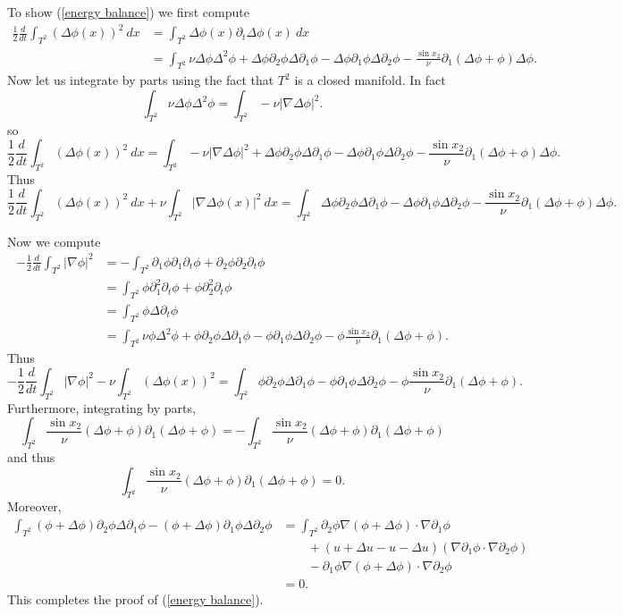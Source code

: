 \documentclass[10pt]{article}
\theoremstyle{definition}
\begin{document}
To show (\ref{energy balance}) we first compute
\begin{align*}
\frac{1}{2} \frac{d}{dt} \int_{T^2} (\Delta \phi(x))^2 ~dx &= \int_{T^2} \Delta \phi(x) \partial_t \Delta \phi(x) ~dx\\
&= \int_{T^2} \nu \Delta \phi \Delta^2 \phi + \Delta \phi \partial_2 \phi \Delta \partial_1 \phi - \Delta \phi \partial_1 \phi \Delta \partial_2 \phi - \frac{\sin x_2}{\nu} \partial_1(\Delta \phi + \phi) \Delta \phi.
\end{align*}
Now let us integrate by parts using the fact that $T^2$ is a closed manifold.
In fact
$$\int_{T^2} \nu \Delta \phi \Delta^2 \phi = \int_{T^2} -\nu |\nabla \Delta \phi|^2.$$
so
$$\frac{1}{2} \frac{d}{dt} \int_{T^2} (\Delta \phi(x))^2 ~dx = \int_{T^2}-\nu |\nabla \Delta \phi|^2 + \Delta \phi \partial_2 \phi \Delta \partial_1 \phi - \Delta \phi \partial_1 \phi \Delta \partial_2 \phi - \frac{\sin x_2}{\nu} \partial_1(\Delta \phi + \phi) \Delta \phi.$$
Thus
$$\frac{1}{2} \frac{d}{dt} \int_{T^2} (\Delta \phi(x))^2 ~dx + \nu \int_{T^2} |\nabla \Delta \phi(x)|^2 ~dx = \int_{T^2} \Delta \phi \partial_2 \phi \Delta \partial_1 \phi - \Delta \phi \partial_1 \phi \Delta \partial_2 \phi - \frac{\sin x_2}{\nu} \partial_1(\Delta \phi + \phi) \Delta \phi.$$

Now we compute
\begin{align*}
-\frac{1}{2} \frac{d}{dt} \int_{T^2} |\nabla \phi|^2 &= -\int_{T^2} \partial_1 \phi \partial_1 \partial_t \phi + \partial_2 \phi \partial_2 \partial_t \phi\\
&= \int_{T^2} \phi \partial_1^2 \partial_t \phi + \phi \partial_2^2 \partial_t \phi\\
&= \int_{T^2} \phi \Delta \partial_t \phi\\
&= \int_{T^2} \nu \phi \Delta^2 \phi + \phi \partial_2 \phi \Delta \partial_1 \phi - \phi \partial_1 \phi \Delta \partial_2 \phi - \phi \frac{\sin x_2}{\nu} \partial_1(\Delta \phi + \phi).
\end{align*}
Thus
$$-\frac{1}{2} \frac{d}{dt} \int_{T^2} |\nabla \phi|^2 - \nu \int_{T^2} (\Delta \phi(x))^2 = \int_{T^2} \phi \partial_2 \phi \Delta \partial_1 \phi - \phi \partial_1 \phi \Delta \partial_2 \phi - \phi \frac{\sin x_2}{\nu} \partial_1(\Delta \phi + \phi).$$
Furthermore, integrating by parts,
$$\int_{T^2} \frac{\sin x_2}{\nu}(\Delta \phi + \phi) \partial_1(\Delta \phi + \phi) = -\int_{T^2}\frac{\sin x_2}{\nu}(\Delta \phi + \phi) \partial_1(\Delta \phi + \phi)$$
and thus
$$\int_{T^2} \frac{\sin x_2}{\nu}(\Delta \phi + \phi) \partial_1(\Delta \phi + \phi) = 0.$$
Moreover,
\begin{align*}
 \int_{T^2} (\phi + \Delta \phi) \partial_2 \phi \Delta \partial_1 \phi - (\phi + \Delta \phi) \partial_1 \phi \Delta \partial_2 \phi
  &= \int_{T^2} \partial_2 \phi \nabla(\phi + \Delta \phi) \cdot \nabla \partial_1 \phi \\
  &\qquad+ (u + \Delta u - u - \Delta u)(\nabla \partial_1 \phi \cdot \nabla \partial_2 \phi) \\
  &\qquad- \partial_1 \phi \nabla(\phi + \Delta \phi) \cdot \nabla \partial_2 \phi\\
  &= 0.
\end{align*}
This completes the proof of (\ref{energy balance}).
\end{document}
